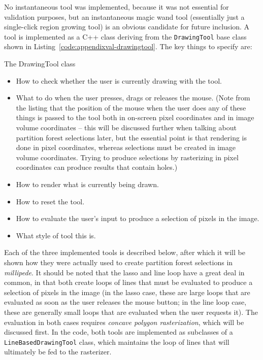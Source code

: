 %
No instantaneous tool was implemented, because it was not essential for validation purposes, but an instantaneous magic wand tool (essentially just a single-click region growing tool) is an obvious candidate for future inclusion. A tool is implemented as a C++ class deriving from the \texttt{DrawingTool} base class shown in Listing~\ref{code:appendixval-drawingtool}. The key things to specify are:

\begin{stulisting}[p]
\caption{The DrawingTool class}
\label{code:appendixval-drawingtool}

\end{stulisting}


\begin{itemize}

\item How to check whether the user is currently drawing with the tool.
\item What to do when the user presses, drags or releases the mouse. (Note from the listing that the position of the mouse when the user does any of these things is passed to the tool both in on-screen pixel coordinates and in image volume coordinates -- this will be discussed further when talking about partition forest selections later, but the essential point is that rendering is done in pixel coordinates, whereas selections must be created in image volume coordinates. Trying to produce selections by rasterizing in pixel coordinates can produce results that contain holes.)
\item How to render what is currently being drawn.
\item How to reset the tool.
\item How to evaluate the user's input to produce a selection of pixels in the image.
\item What style of tool this is.

\end{itemize}
%
Each of the three implemented tools is described below, after which it will be shown how they were actually used to create partition forest selections in \emph{millipede}. It should be noted that the lasso and line loop have a great deal in common, in that both create loops of lines that must be evaluated to produce a selection of pixels in the image (in the lasso case, these are large loops that are evaluated as soon as the user releases the mouse button; in the line loop case, these are generally small loops that are evaluated when the user requests it). The evaluation in both cases requires \emph{concave polygon rasterization}, which will be discussed first. In the code, both tools are implemented as subclasses of a \texttt{LineBasedDrawingTool} class, which maintains the loop of lines that will ultimately be fed to the rasterizer.

